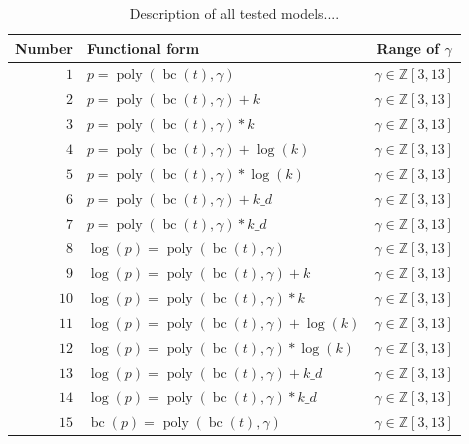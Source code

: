 \documentclass[12pt,a4paper]{article}
\DeclareMathOperator{\bc}{bc}
\DeclareMathOperator{\poly}{poly}
\begin{document}
\begin{table}
    \centering
    \caption{Description of all tested models....}
    \label{tab:func_form}    
    \begin{tabular}{rlc}
        Number & Functional form & Range of $\gamma$ \\
        \toprule
        $1$ & $p = \poly\left( \bc(t), \gamma \right) $ & $\gamma \in \mathbb{Z} \left[3, 13 \right]$\\ 
        $2$ & $p = \poly\left( \bc(t), \gamma \right) + k $ & $\gamma \in \mathbb{Z} \left[3, 13 \right]$\\
        $3$ & $p = \poly\left( \bc(t), \gamma \right) * k $ & $\gamma \in \mathbb{Z} \left[3, 13 \right]$\\
        $4$ & $p = \poly\left( \bc(t), \gamma \right) + \log(k) $ & $\gamma \in \mathbb{Z} \left[3, 13 \right]$\\
        $5$ & $p = \poly\left( \bc(t), \gamma \right) * \log(k) $ & $\gamma \in \mathbb{Z} \left[3, 13 \right]$\\
        $6$ & $p = \poly\left( \bc(t), \gamma \right) + k\_d $ & $\gamma \in \mathbb{Z} \left[3, 13 \right]$\\
        $7$ & $p = \poly\left( \bc(t), \gamma \right) * k\_d $ & $\gamma \in \mathbb{Z} \left[3, 13 \right]$\\ %
        \midrule
        $8$ & $\log(p) = \poly\left( \bc(t), \gamma \right) $ & $\gamma \in \mathbb{Z} \left[3, 13 \right]$\\ 
        $9$ & $\log(p) = \poly\left( \bc(t), \gamma \right) + k $ & $\gamma \in \mathbb{Z} \left[3, 13 \right]$\\
        $10$ & $\log(p) = \poly\left( \bc(t), \gamma \right) * k $ & $\gamma \in \mathbb{Z} \left[3, 13 \right]$\\
        $11$ & $\log(p) = \poly\left( \bc(t), \gamma \right) + \log(k) $ & $\gamma \in \mathbb{Z} \left[3, 13 \right]$\\
        $12$ & $\log(p) = \poly\left( \bc(t), \gamma \right) * \log(k) $ & $\gamma \in \mathbb{Z} \left[3, 13 \right]$\\
        $13$ & $\log(p) = \poly\left( \bc(t), \gamma \right) + k\_d $ & $\gamma \in \mathbb{Z} \left[3, 13 \right]$\\
        $14$ & $\log(p) = \poly\left( \bc(t), \gamma \right) * k\_d $ & $\gamma \in \mathbb{Z} \left[3, 13 \right]$\\   
        \midrule
        $15$ & $\bc(p) = \poly\left( \bc(t), \gamma \right) $ & $\gamma \in \mathbb{Z} \left[3, 13 \right]$\\ 

\end{tabular}
\end{table}
\end{document}
